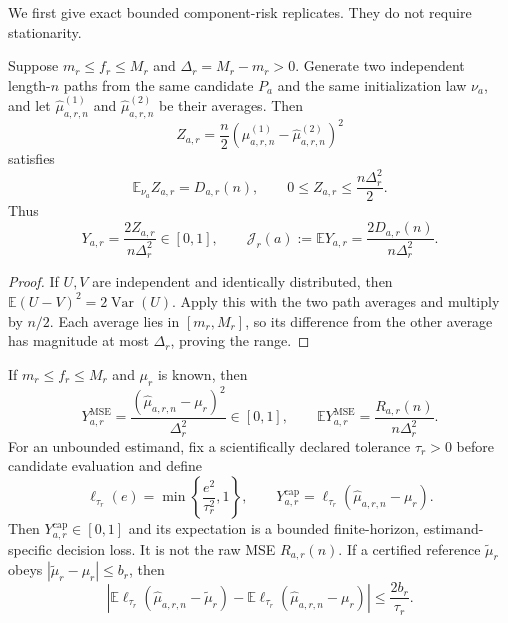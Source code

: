 We first give exact bounded component-risk replicates.  They do not require
stationarity.

\begin{proposition}
\label{prop:s2-paired-dispersion}
Suppose \(m_r\leq f_r\leq M_r\) and
\(\Delta_r=M_r-m_r>0\).  Generate two independent length-\(n\) paths from the
same candidate \(P_a\) and the same initialization law \(\nu_a\), and let
\(\widehat\mu^{(1)}_{a,r,n}\) and
\(\widehat\mu^{(2)}_{a,r,n}\) be their averages.  Then
\begin{equation}
 Z_{a,r}
 =
 \frac n2
 \left(
  \widehat\mu^{(1)}_{a,r,n}
  -
  \widehat\mu^{(2)}_{a,r,n}
 \right)^2
 \label{eq:s2-paired-z}
\end{equation}
satisfies
\begin{equation}
 \mathbb E_{\nu_a}Z_{a,r}=D_{a,r}(n),
 \qquad
 0\leq Z_{a,r}\leq\frac{n\Delta_r^2}{2}.
 \label{eq:s2-paired-range}
\end{equation}
Thus
\[
 Y_{a,r}
 =
 \frac{2Z_{a,r}}{n\Delta_r^2}
 \in[0,1],
 \qquad
 \mathcal J_r(a):=\mathbb EY_{a,r}
 =
 \frac{2D_{a,r}(n)}{n\Delta_r^2}.
\]
\end{proposition}

\begin{proof}
If \(U,V\) are independent and identically distributed, then
\(\mathbb E(U-V)^2=2\operatorname{Var}(U)\).  Apply this with the two path
averages and multiply by \(n/2\).  Each average lies in \([m_r,M_r]\), so its
difference from the other average has magnitude at most \(\Delta_r\), proving
the range.
\end{proof}

\begin{proposition}
\label{prop:s2-bounded-loss}
If \(m_r\leq f_r\leq M_r\) and \(\mu_r\) is known, then
\[
 Y_{a,r}^{\mathrm{MSE}}
 =
 \frac{(\widehat\mu_{a,r,n}-\mu_r)^2}{\Delta_r^2}
 \in[0,1],
 \qquad
 \mathbb E Y_{a,r}^{\mathrm{MSE}}
 =
 \frac{R_{a,r}(n)}{n\Delta_r^2}.
\]
For an unbounded estimand, fix a scientifically declared tolerance
\(\tau_r>0\) before candidate evaluation and define
\[
 \ell_{\tau_r}(e)
 =
 \min\left\{\frac{e^2}{\tau_r^2},1\right\},
 \qquad
 Y_{a,r}^{\mathrm{cap}}
 =
 \ell_{\tau_r}(\widehat\mu_{a,r,n}-\mu_r).
\]
Then \(Y_{a,r}^{\mathrm{cap}}\in[0,1]\) and its expectation is a bounded
finite-horizon, estimand-specific decision loss.  It is not the raw MSE
\(R_{a,r}(n)\).  If a certified reference \(\widetilde\mu_r\) obeys
\(|\widetilde\mu_r-\mu_r|\leq b_r\), then
\begin{equation}
 \left|
  \mathbb E\ell_{\tau_r}
    (\widehat\mu_{a,r,n}-\widetilde\mu_r)
  -
  \mathbb E\ell_{\tau_r}
    (\widehat\mu_{a,r,n}-\mu_r)
 \right|
 \leq
 \frac{2b_r}{\tau_r}.
 \label{eq:s2-reference-loss}
\end{equation}
\end{proposition}


